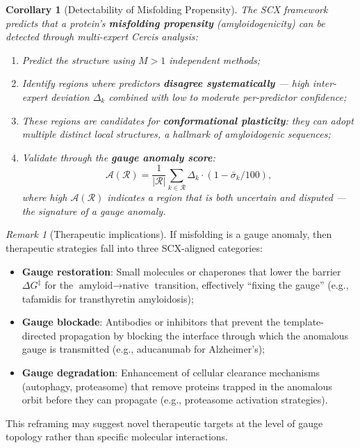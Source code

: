 \documentclass[12pt,a4paper]{article}
\newtheorem{corollary}[theorem]{Corollary}
\theoremstyle{remark}
\newtheorem{remark}[theorem]{Remark}
\begin{document}
\begin{corollary}[Detectability of Misfolding Propensity]
\label{cor:misfold-detect}
The SCX framework predicts that a protein's \textbf{misfolding propensity} (amyloidogenicity) can be detected through multi-expert Cercis analysis:
\begin{enumerate}[leftmargin=*,label=(\alph*)]
    \item Predict the structure using $M > 1$ independent methods;
    \item Identify regions where predictors \textbf{disagree systematically} — high inter-expert deviation $\Delta_k$ combined with low to moderate per-predictor confidence;
    \item These regions are candidates for \textbf{conformational plasticity}: they can adopt multiple distinct local structures, a hallmark of amyloidogenic sequences;
    \item Validate through the \textbf{gauge anomaly score}:
    \begin{equation}
        \mathcal{A}(\mathcal{R}) = \frac{1}{|\mathcal{R}|}\sum_{k \in \mathcal{R}} \Delta_k \cdot (1 - \bar{\sigma}_k / 100),
    \end{equation}
    where high $\mathcal{A}(\mathcal{R})$ indicates a region that is both uncertain and disputed — the signature of a gauge anomaly.
\end{enumerate}
\end{corollary}

\begin{remark}[Therapeutic implications]
If misfolding is a gauge anomaly, then therapeutic strategies fall into three SCX-aligned categories:
\begin{itemize}[leftmargin=*]
    \item \textbf{Gauge restoration}: Small molecules or chaperones that lower the barrier $\Delta G^\ddagger$ for the $\text{amyloid} \to \text{native}$ transition, effectively ``fixing the gauge'' (e.g., tafamidis for transthyretin amyloidosis);
    \item \textbf{Gauge blockade}: Antibodies or inhibitors that prevent the template-directed propagation by blocking the interface through which the anomalous gauge is transmitted (e.g., aducanumab for Alzheimer's);
    \item \textbf{Gauge degradation}: Enhancement of cellular clearance mechanisms (autophagy, proteasome) that remove proteins trapped in the anomalous orbit before they can propagate (e.g., proteasome activation strategies).
\end{itemize}
This reframing may suggest novel therapeutic targets at the level of gauge topology rather than specific molecular interactions.
\end{remark}
\end{document}
